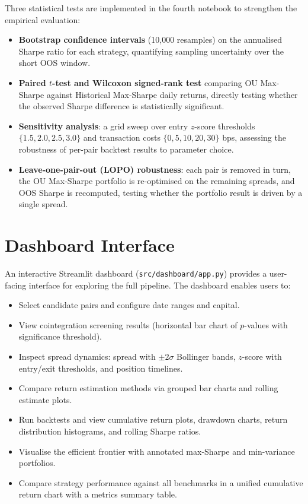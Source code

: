 \documentclass[a4paper]{report}
\begin{document}
Three statistical tests are implemented in the fourth notebook to strengthen the empirical evaluation:
\begin{itemize}
    \item \textbf{Bootstrap confidence intervals} (10{,}000 resamples) on the annualised Sharpe ratio for each strategy, quantifying sampling uncertainty over the short OOS window.
    \item \textbf{Paired $t$-test and Wilcoxon signed-rank test} comparing OU Max-Sharpe against Historical Max-Sharpe daily returns, directly testing whether the observed Sharpe difference is statistically significant.
    \item \textbf{Sensitivity analysis}: a grid sweep over entry $z$-score thresholds $\{1.5, 2.0, 2.5, 3.0\}$ and transaction costs $\{0, 5, 10, 20, 30\}$ bps, assessing the robustness of per-pair backtest results to parameter choice.
    \item \textbf{Leave-one-pair-out (LOPO) robustness}: each pair is removed in turn, the OU Max-Sharpe portfolio is re-optimised on the remaining spreads, and OOS Sharpe is recomputed, testing whether the portfolio result is driven by a single spread.
\end{itemize}

\section{Dashboard Interface}

An interactive Streamlit dashboard (\texttt{src/dashboard/app.py}) provides a user-facing interface for exploring the full pipeline. The dashboard enables users to:
\begin{itemize}
    \item Select candidate pairs and configure date ranges and capital.
    \item View cointegration screening results (horizontal bar chart of $p$-values with significance threshold).
    \item Inspect spread dynamics: spread with $\pm 2\sigma$ Bollinger bands, $z$-score with entry/exit thresholds, and position timelines.
    \item Compare return estimation methods via grouped bar charts and rolling estimate plots.
    \item Run backtests and view cumulative return plots, drawdown charts, return distribution histograms, and rolling Sharpe ratios.
    \item Visualise the efficient frontier with annotated max-Sharpe and min-variance portfolios.
    \item Compare strategy performance against all benchmarks in a unified cumulative return chart with a metrics summary table.
\end{itemize}
\end{document}
